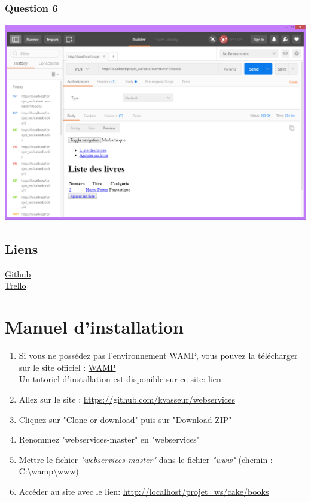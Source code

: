 \documentclass{report}
\begin{document}
		\subsection{Question 6}
		\begin{center}
			\includegraphics[scale=0.4]{img/resultats/q6.png} 
		\end{center} 
		
	\section{Liens}
		\href{https://github.com/kvasseur/webservices}{Github} \\
		\href{https://trello.com/b/A1vuuQZb/webservices-api-rest-mediatheque}{Trello}
	
	
	\chapter{Manuel d'installation}
	
	\begin{enumerate}
		\item Si vous ne poss\'{e}dez pas l'environnement WAMP, vous pouvez la t\'{e}l\'{e}charger sur le site officiel : \href{http://www.wampserver.com/}{WAMP}\\
		Un tutoriel d'installation est disponible sur ce site: \href{http://www.cndp.fr/crdp-dijon/Installer-et-configurer-Wampserver.html}{lien}
		\item Allez sur le site : \url{https://github.com/kvasseur/webservices}
		\item Cliquez sur "Clone or download" puis sur "Download ZIP"
		\item Renommez "webservices-master" en "webservices"
		\item Mettre le fichier \textit{"webservices-master"} dans le fichier \textit{"www"} (chemin : C:\textbackslash wamp\textbackslash www)
		\item Acc\'{e}der au site avec le lien: \url{http://localhost/projet_ws/cake/books}
	\end{enumerate}
	
\end{document}
